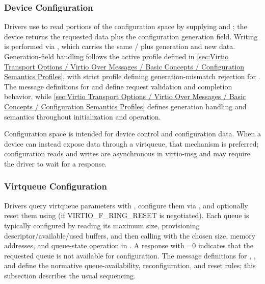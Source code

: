 \subsubsection{Device Configuration}
\label{sec:Virtio Transport Options / Virtio Over Messages / Device Initialization / Device Configuration}

Drivers use  to read portions of the configuration space by
supplying  and ; the device returns the requested
data plus the configuration generation field. Writing is performed via
, which carries the same / plus
generation and new data.
Generation-field handling follows the active profile defined in
\ref{sec:Virtio Transport Options / Virtio Over Messages / Basic Concepts / Configuration Semantics Profiles},
with strict profile defining generation-mismatch rejection for .
The message definitions for  and 
define request validation and completion behavior, while
\ref{sec:Virtio Transport Options / Virtio Over Messages / Basic Concepts / Configuration Semantics Profiles}
defines generation handling and  semantics throughout
initialization and operation.

Configuration space is intended for device control and configuration data.
When a device can instead expose data through a virtqueue, that mechanism is
preferred; configuration reads and writes are asynchronous in virtio-msg and
may require the driver to wait for a response.

\subsubsection{Virtqueue Configuration}
\label{sec:Virtio Transport Options / Virtio Over Messages / Device Initialization / Virtqueue Configuration}

Drivers query virtqueue parameters with , configure them via
, and optionally reset them using  (if
VIRTIO\_F\_RING\_RESET is negotiated). Each queue is typically configured by
reading its maximum size, provisioning descriptor/available/used buffers, and
then calling  with the chosen size, memory addresses, and
queue-state operation in . A  response with
=0 indicates that the requested queue is not available for
configuration. The message definitions for ,
, and  define the normative
queue-availability, reconfiguration, and reset rules; this subsection
describes the usual sequencing.

